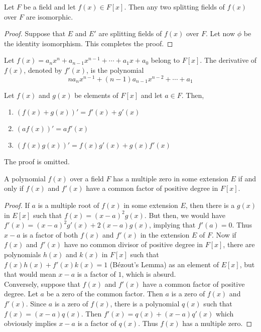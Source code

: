 \begin{corollary}
	Let $F$ be a field and let $f(x)\in F[x]$. Then any two splitting fields of $f(x)$ over $F$ are isomorphic.
\end{corollary}
\begin{proof}
	Suppose that $E$ and $E'$ are splitting fields of $f(x)$ over $F$. Let now $\phi$ be the identity isomorphism. This completes the proof.
\end{proof}

\begin{definition}
	Let $f(x)=a_nx^n+a_{n-1}x^{n-1}+\cdots+a_1x+a_0$ belong to $F[x]$. The derivative of $f(x)$, denoted by $f'(x)$, is the polynomial 
	\begin{equation*}
		na_{n}x^{n-1}+(n-1)a_{n-1}x^{n-2}+\cdots+a_1
	\end{equation*}
\end{definition}

\begin{lemma}
	Let $f(x)$ and $g(x)$ be elements of $F[x]$ and let $a\in F$. Then,
	\begin{enumerate}
		\item $(f(x)+g(x))'=f'(x)+g'(x)$
		\item $(af(x))' = af'(x)$
		\item $(f(x)g(x))' = f(x)g'(x)+g(x)f'(x)$
	\end{enumerate}
\end{lemma}
The proof is omitted.

\begin{proposition}
	A polynomial $f(x)$ over a field $F$ has a multiple zero in some extension $E$ if and only if $f(x)$ and $f'(x)$ have a common factor of positive degree in $F[x]$.
\end{proposition}
\begin{proof}
	If $a$ is a multiple root of $f(x)$ in some extension $E$, then there is a $g(x)$ in $E[x]$ such that $f(x)=(x-a)^2g(x)$. But then, we would have $f'(x)=(x-a)^2g'(x)+2(x-a)g(x)$, implying that $f'(a)=0$. Thus $x-a$ is a factor of both $f(x)$ and $f'(x)$ in the extension $E$ of $F$. Now if $f(x)$ and $f'(x)$ have no common divisor of positive degree in $F[x]$, there are polynomials $h(x)$ and $k(x)$ in $F[x]$ such that $f(x)h(x)+f'(x)k(x)=1$ (B\'ezout's Lemma) as an element of $E[x]$, but that would mean $x-a$ is a factor of $1$, which is absurd.\\
	Conversely, suppose that $f(x)$ and $f'(x)$ have a common factor of positive degree. Let $a$ be a zero of the common factor. Then $a$ is a zero of $f(x)$ and $f'(x)$. Since $a$ is a zero of $f(x)$, there is a polynomial $q(x)$ such that $f(x)=(x-a)q(x)$. Then $f'(x)=q(x)+(x-a)q'(x)$ which obviously implies $x-a$ is a factor of $q(x)$. Thus $f(x)$ has a multiple zero.
\end{proof}

